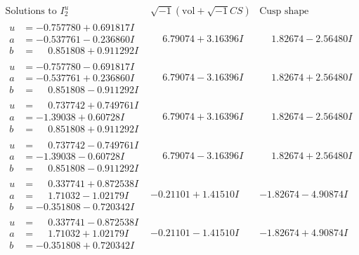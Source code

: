 \documentclass[1p]{elsarticle_modified}
\theoremstyle{definition}
\newcommand{\I}{\sqrt{-1}}
\begin{document}
$$\begin{array}{c|c|c}  
\text{Solutions to }I^u_{2}& \I (\text{vol} + \sqrt{-1}CS) & \text{Cusp shape}\\
 \hline 
\begin{aligned}
u &= -0.757780 + 0.691817 I \\
a &= -0.537761 - 0.236860 I \\
b &= \phantom{-}0.851808 + 0.911292 I\end{aligned}
 & \phantom{-}6.79074 + 3.16396 I & \phantom{-}1.82674 - 2.56480 I \\ \hline\begin{aligned}
u &= -0.757780 - 0.691817 I \\
a &= -0.537761 + 0.236860 I \\
b &= \phantom{-}0.851808 - 0.911292 I\end{aligned}
 & \phantom{-}6.79074 - 3.16396 I & \phantom{-}1.82674 + 2.56480 I \\ \hline\begin{aligned}
u &= \phantom{-}0.737742 + 0.749761 I \\
a &= -1.39038 + 0.60728 I \\
b &= \phantom{-}0.851808 + 0.911292 I\end{aligned}
 & \phantom{-}6.79074 + 3.16396 I & \phantom{-}1.82674 - 2.56480 I \\ \hline\begin{aligned}
u &= \phantom{-}0.737742 - 0.749761 I \\
a &= -1.39038 - 0.60728 I \\
b &= \phantom{-}0.851808 - 0.911292 I\end{aligned}
 & \phantom{-}6.79074 - 3.16396 I & \phantom{-}1.82674 + 2.56480 I \\ \hline\begin{aligned}
u &= \phantom{-}0.337741 + 0.872538 I \\
a &= \phantom{-}1.71032 - 1.02179 I \\
b &= -0.351808 - 0.720342 I\end{aligned}
 & -0.21101 + 1.41510 I & -1.82674 - 4.90874 I \\ \hline\begin{aligned}
u &= \phantom{-}0.337741 - 0.872538 I \\
a &= \phantom{-}1.71032 + 1.02179 I \\
b &= -0.351808 + 0.720342 I\end{aligned}
 & -0.21101 - 1.41510 I & -1.82674 + 4.90874 I \\ \hline\begin{aligned}

\end{aligned}
\end{array}$$
\end{document}
